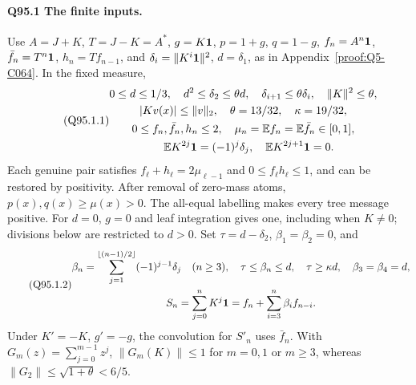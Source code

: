 \paragraph{Q95.1 The finite inputs.}
Use \(A=\allowbreak J+K\), \(T=\allowbreak J-K=\allowbreak A^*\), \(g=\allowbreak K\mathbf1\), \(p=\allowbreak 1+g\), \(q=\allowbreak 1-g\),
\(f_n=\allowbreak A^n\mathbf1\), \(\bar f_n=\allowbreak T^n\mathbf1\), \(h_n=\allowbreak Tf_{n-1}\), and
\(\delta_i=\allowbreak \|K^i\mathbf1\|^2\), \(d=\allowbreak \delta_1\), as in
Appendix~\ref{proof:Q5-C064}. In the fixed measure,
\begin{equation}\tag{Q95.1.1}\label{eq:Q95:1.1}
\begin{gathered}
0\le d\le1/3,\quad d^2\le\delta_2\le\theta d,\quad
\delta_{i+1}\le\theta\delta_i,\quad\|K\|^2\le\theta,\\
|Kv(x)|\le\|v\|_2,\quad\theta=13/32,\quad\kappa=19/32,\\
0\le f_n,\bar f_n,h_n\le2,\quad\mu_n=\mathbb E f_n=\mathbb E\bar f_n\in[0,1],\\
\quad\mathbb E K^{2j}\mathbf1=(-1)^j\delta_j,\quad\mathbb E K^{2j+1}\mathbf1=0.
\end{gathered}
\end{equation}
Each genuine pair satisfies \(f_\ell+h_\ell=\allowbreak 2\mu_{\ell-1}\) and
\(0\le\allowbreak  f_\ell h_\ell\le\allowbreak 1\), and can be restored by positivity.
After removal of zero-mass atoms, \(p(x),\allowbreak q(x)\ge\allowbreak \mu(x)>\allowbreak 0\).
The all-equal labelling makes every tree message positive.
For \(d=\allowbreak 0\), \(g=\allowbreak 0\) and leaf integration gives one, including when
\(K\ne0\); divisions below are restricted to \(d>\allowbreak 0\).
Set \(\tau=\allowbreak d-\delta_2\), \(\beta_1=\allowbreak \beta_2=\allowbreak 0\), and
\begin{equation}\tag{Q95.1.2}\label{eq:Q95:1.2}
\begin{gathered}
\beta_n=\sum_{j=1}^{\lfloor(n-1)/2\rfloor}(-1)^{j-1}\delta_j
\quad(n\ge3),\quad\tau\le\beta_n\le d,\quad\tau\ge\kappa d,
\quad\beta_3=\beta_4=d,\\
S_n=\sum_{j=0}^nK^j\mathbf1=f_n+\sum_{i=3}^n\beta_i f_{n-i}.
\end{gathered}
\end{equation}
Under \(K'=\allowbreak -K\), \(g'=\allowbreak -g\), the convolution for \(S'_n\) uses
\(\bar f_n\). With \(G_m(z)=\allowbreak \sum_{j=\allowbreak 0}^{m-1}z^j\),
\(\|G_m(K)\|\le\allowbreak 1\) for \(m=\allowbreak 0,\allowbreak 1\) or \(m\ge\allowbreak 3\), whereas
\(\|G_2\|\le\allowbreak \sqrt{1+\theta}<\allowbreak 6/5\).
